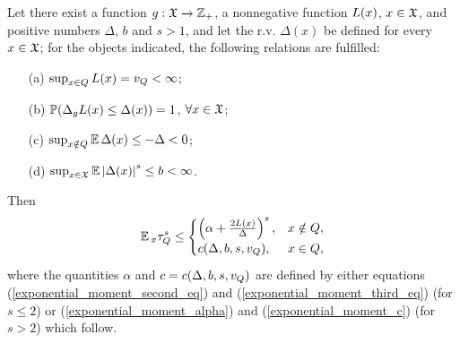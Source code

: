 	\begin{repeated_theorem}
		Let there exist a function $g:\mathfrak{X} \xrightarrow{} \mathbb{Z}_{+}$, a nonnegative function $L(x)$, $x \in \mathfrak{X}$, and positive numbers $\Delta$, $b$ and $s > 1$, and let the r.v. $\Delta(x)$ be defined for every $x \in \mathfrak{X}$; for the objects indicated, the following relations are fulfilled:
		\begin{enumerate}
			\item[(a)] $\sup_{x \in Q}L(x) = v_{Q} < \infty$;
			\item[(b)] $\operatorname*{\mathbb{P}}(\Delta_{g}L(x) \leq \Delta(x)) = 1$, $\forall x \in \mathfrak{X}$;
			\item[(c)] $\sup_{x \notin Q}\operatorname*{\mathbb{E}}\Delta(x) \leq -\Delta < 0$;
			\item[(d)] $\sup_{x \in \mathfrak{X}}\operatorname*{\mathbb{E}}\left|\Delta(x)\right|^{s} \leq b < \infty$.
		\end{enumerate}
		Then
		\begin{align}
		\operatorname*{\mathbb{E}}{}_{x}\tau_{Q}^{s} \leq \begin{cases}
		\left(\alpha + \frac{2L(x)}{\Delta}\right)^{s}, & x \notin Q,\\
		c(\Delta, b, s, v_{Q}), & x \in Q,
		\end{cases}
		\label{exponential_moment_result_estimation}
		\end{align}
		where the quantities $\alpha$ and $c = c(\Delta, b, s, v_{Q})$ are defined by either equations (\ref{exponential_moment_second_eq}) and (\ref{exponential_moment_third_eq}) (for $s \leq 2$) or (\ref{exponential_moment_alpha}) and (\ref{exponential_moment_c}) (for $s > 2$) which follow.
		\label{Exponential_moment_theorem}
	\end{repeated_theorem}
	
